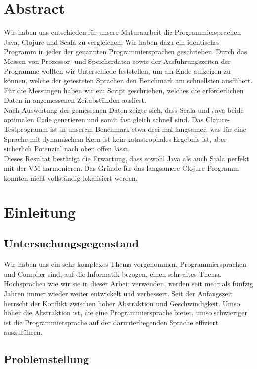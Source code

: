 \documentclass{fancydocument}
\begin{document}
\section{Abstract}
Wir haben uns entschieden für unsere Maturaarbeit die
Programmiersprachen Java, Clojure und Scala zu vergleichen. Wir haben
dazu ein identisches Programm in jeder der genannten
Programmiersprachen geschrieben. Durch das Messen von Prozessor- und
Speicherdaten sowie der Ausführungszeiten der Programme wollten wir
Unterschiede feststellen, um am Ende aufzeigen zu können, welche der
getesteten Sprachen den Benchmark am schnellsten ausf\"uhert. Für die
Messungen haben wir ein Script geschrieben,
welches die erforderlichen Daten in angemessenen Zeitabständen
ausliest. 
\\
Nach Auswertung der gemessenen Daten zeigte sich, dass Scala
und Java beide optimalen Code generieren und somit fast gleich schnell
sind. Das Clojure-Testprogramm ist in unserem Benchmark
etwa drei mal langsamer, was für eine Sprache mit dynamischem Kern
ist kein katastrophales Ergebnis ist, aber sicherlich Potenzial nach
oben offen l\"asst. 
\\
Dieses Resultat best\"atigt die Erwartung, dass
sowohl Java als auch Scala perfekt mit der VM harmonieren.
Das Gr\"unde f\"ur das langsamere Clojure Programm konnten nicht vollständig
lokalisiert werden. 


\section{Einleitung}

\subsection{Untersuchungsgegenstand}

Wir haben uns ein sehr komplexes Thema vorgenommen. Programmiersprachen und Compiler sind, auf die Informatik bezogen, einen sehr altes Thema. \\
Hochsprachen wie wir sie in dieser Arbeit verwenden, werden seit mehr
als fünfzig Jahren immer wieder weiter entwickelt und verbessert. Seit
der Anfangszeit herrscht der Konflikt zwischen hoher Abstraktion und
Geschwindigkeit. Umso höher die Abstraktion ist, die eine
Programmiersprache bietet, umso schwieriger ist die Programmiersprache
auf der darunterliegenden Sprache effizient auszuführen.

\subsection{Problemstellung}
\end{document}
